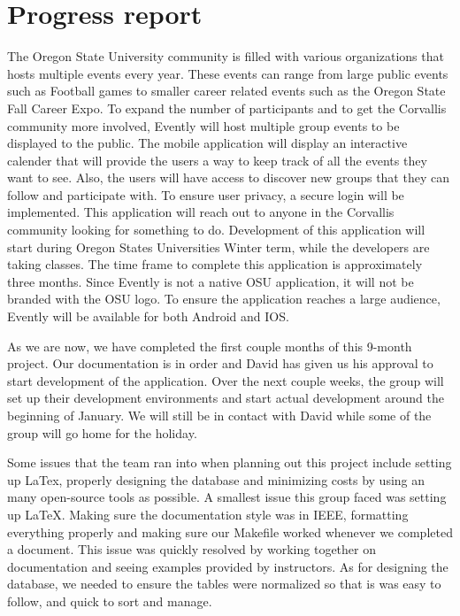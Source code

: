 \documentclass[letterpaper, 10pt,titlepage]{article}
\begin{document}
\section{Progress report}
The Oregon State University community is filled with various organizations that hosts multiple events every year. These events can range from large public events such as Football games to smaller career related events such as the Oregon State Fall Career Expo. To expand the number of participants and to get the Corvallis community more involved, Evently will host multiple group events to be displayed to the public. The mobile application will display an interactive calender that will provide the users a way to keep track of all the events they want to see. Also, the users will have access to discover new groups that they can follow and participate with. To ensure user privacy, a secure login will be implemented. This application will reach out to anyone in the Corvallis community looking for something to do. Development of this application will start during Oregon States Universities Winter term, while the developers are taking classes. The time frame to complete this application is approximately three months. Since Evently is not a native OSU application, it will not be branded with the OSU logo. To ensure the application reaches a large audience, Evently will be available for both Android and IOS.

As we are now, we have completed the first couple months of this 9-month project. Our documentation is in order and David has given us his approval to start development of the application. Over the next couple weeks, the group will set up their development environments and start actual development around the beginning of January. We will still be in contact with David while some of the group will go home for the holiday. 

Some issues that the team ran into when planning out this project include setting up LaTex, properly designing the database and minimizing costs by using an many open-source tools as possible. A smallest issue this group faced was setting up LaTeX. Making sure the documentation style was in IEEE, formatting everything properly and making sure our Makefile worked whenever we completed a document. This issue was quickly resolved by working together on documentation and seeing examples provided by instructors. As for designing the database, we needed to ensure the tables were normalized so that is was easy to follow, and quick to sort and manage.
\end{document}
